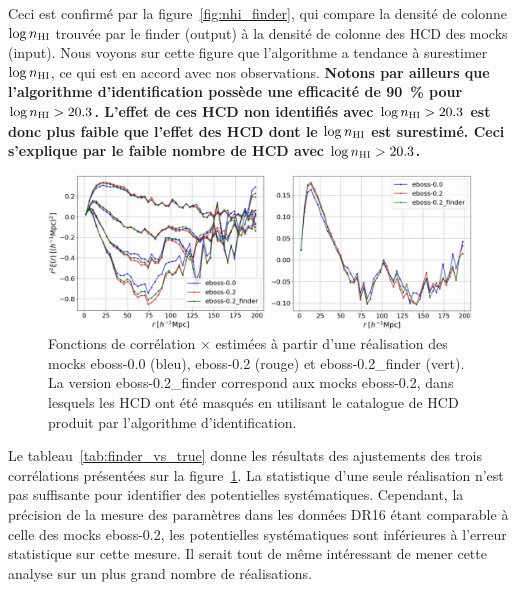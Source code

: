 \documentclass[11pt, twoside, a4paper, openright]{report}
\begin{document}
Ceci est confirmé par la figure~\ref{fig:nhi_finder}, qui compare la densité de colonne $\log n_{\textsc{HI}}$ trouvée par le finder (output) à la densité de colonne des HCD des mocks (input). Nous voyons sur cette figure que l'algorithme a tendance à surestimer $\log n_{\textsc{HI}}$, ce qui est en accord avec nos observations.
\textbf{Notons par ailleurs que l'algorithme d'identification possède une efficacité de \SI{90}{\percent} pour $\log n_{\textsc{HI}} > \num{20.3}$. L'effet de ces HCD non identifiés avec $\log n_{\textsc{HI}} > \num{20.3}$ est donc plus faible que l'effet des HCD dont le $\log n_{\textsc{HI}}$ est surestimé.
  Ceci s'explique par le faible nombre de HCD avec $\log n_{\textsc{HI}} > \num{20.3}$.}


\begin{figure}
  \centering
  \includegraphics[scale=0.4]{cf_finder_vs_true}
  \caption{Fonctions de corrélation \lya{}$\times$\lya{} estimées à partir d'une réalisation des mocks eboss-0.0 (bleu), eboss-0.2 (rouge) et eboss-0.2\_finder (vert). La version eboss-0.2\_finder correspond aux mocks eboss-0.2, dans lesquels les HCD ont été masqués en utilisant le catalogue de HCD produit par l'algorithme d'identification.}
  \label{fig:cf_finder_vs_true}
\end{figure}

Le tableau~\ref{tab:finder_vs_true} donne les résultats des ajustements des trois corrélations présentées sur la figure~\ref{fig:cf_finder_vs_true}. La statistique d'une seule réalisation n'est pas suffisante pour identifier des potentielles systématiques. Cependant, la précision de la mesure des paramètres \lya{} dans les données DR16 étant comparable à celle des mocks eboss-0.2, les potentielles systématiques sont inférieures à l'erreur statistique sur cette mesure.
Il serait tout de même intéressant de mener cette analyse sur un plus grand nombre de réalisations.
\end{document}

